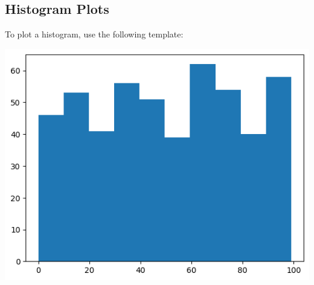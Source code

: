 \subsection{Histogram Plots}
To plot a histogram, use the following template:
\begin{minipage}{0.49\linewidth}
    
\end{minipage}
\begin{minipage}{0.49\linewidth}
    \includegraphics[width = \linewidth]{src/11_matplotlib/images/histogram_plot.png}
\end{minipage}

